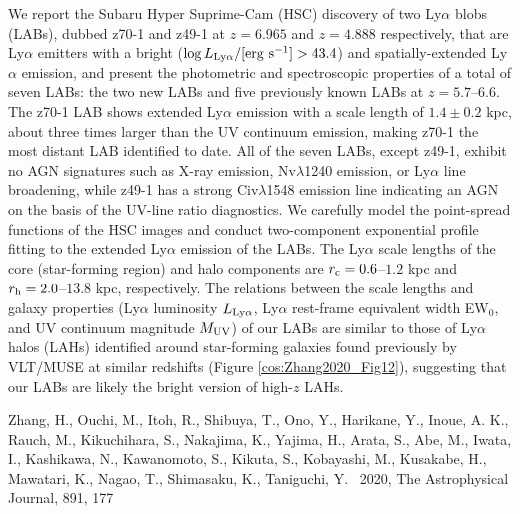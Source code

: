 We report the Subaru Hyper Suprime-Cam (HSC) discovery of two Ly$\alpha$ blobs (LABs), 
dubbed z70-1 and z49-1 at $z=6.965$ and $z=4.888$ respectively, 
that are Ly$\alpha$ emitters with a bright ($\log L_{\rm Ly\alpha}/{\rm [erg\ s^{-1}]}>43.4$) 
and spatially-extended Ly$\alpha$ emission, 
and present the photometric and spectroscopic properties of a total of seven LABs: 
the two new LABs and five previously known LABs at $z=5.7$--$6.6$. 
The z70-1 LAB shows extended Ly$\alpha$ emission with a scale length of $1.4\pm 0.2$ kpc, 
about three times larger than the UV continuum emission, 
making z70-1 the most distant LAB identified to date. 
All of the seven LABs, except z49-1, exhibit no AGN signatures such as X-ray emission, 
{\sc Nv}$\lambda$1240 emission, or Ly$\alpha$ line broadening, 
while z49-1 has a strong {\sc Civ}$\lambda$1548 emission line 
indicating an AGN on the basis of the UV-line ratio diagnostics. 
We carefully model the point-spread functions of the HSC images 
and conduct two-component exponential profile fitting 
to the extended Ly$\alpha$ emission of the LABs. 
The Ly$\alpha$ scale lengths of the core (star-forming region) 
and halo components are $r_{\rm c}=0.6$--$1.2$ kpc and $r_{\rm h}=2.0$--$13.8$ kpc, respectively. 
The relations between the scale lengths and galaxy properties 
(Ly$\alpha$ luminosity $L_{\rm Ly\alpha}$, Ly$\alpha$ rest-frame equivalent width EW$_0$, 
and UV continuum magnitude $M_{\rm UV}$) of our LABs 
are similar to those of Ly$\alpha$ halos (LAHs) 
identified around star-forming galaxies 
found previously by VLT/MUSE at similar redshifts (Figure \ref{cos:Zhang2020_Fig12}), 
suggesting that our LABs are likely the bright version of high-$z$ LAHs. 


\begin{thebibliography}{9}
Zhang, H., Ouchi, M., Itoh, R., Shibuya, T., Ono, Y., Harikane, Y., Inoue, A. K., Rauch, M., Kikuchihara, S., Nakajima, K., Yajima, H., Arata, S., Abe, M., Iwata, I., Kashikawa, N., Kawanomoto, S., Kikuta, S., Kobayashi, M., Kusakabe, H., Mawatari, K., Nagao, T., Shimasaku, K., Taniguchi, Y.
\ 2020, 
The Astrophysical Journal, 891, 177 
\end{thebibliography}


